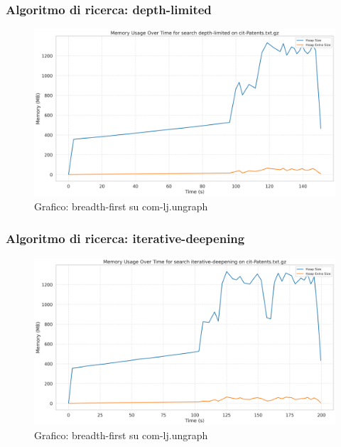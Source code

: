 \documentclass{article}
\begin{document}
\subsubsection{Algoritmo di ricerca: depth-limited}
\begin{figure}[h]\centering
\includegraphics[width=\textwidth]{../plots/cit-Patents_depth-limited.png}
\caption{Grafico: breadth-first su com-lj.ungraph}
\end{figure}
\subsubsection{Algoritmo di ricerca: iterative-deepening}
\begin{figure}[h]\centering
\includegraphics[width=\textwidth]{../plots/cit-Patents_iterative-deepening.png}
\caption{Grafico: breadth-first su com-lj.ungraph}
\end{figure}
\end{document}
